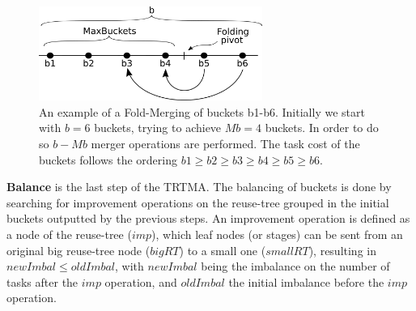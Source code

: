 \begin{figure}[t!]
\begin{center}
				\includegraphics[width=0.65\textwidth]{img/fold}
\caption{An example of a Fold-Merging of buckets b1-b6. Initially we start with $b=6$ buckets, trying to achieve $Mb=4$ buckets. In order to do so $b-Mb$ merger operations are performed. The task cost of the buckets follows the ordering $b1 \geq b2 \geq b3 \geq b4 \geq b5 \geq b6$.}
\label{fig:fold}
\end{center}
\vspace{-4mm}
\end{figure}

\textbf{Balance} is the last step of the TRTMA. The balancing of buckets is done by searching for improvement operations on the reuse-tree grouped in the initial buckets outputted by the previous steps. An improvement operation is defined as a node of the reuse-tree ($imp$), which leaf nodes (or stages) can be sent from an original big reuse-tree node ($bigRT$) to a small one ($smallRT$), resulting in $newImbal \leq oldImbal$, with $newImbal$ being the imbalance on the number of tasks after the $imp$ operation, and $oldImbal$ the initial imbalance before the $imp$ operation.


